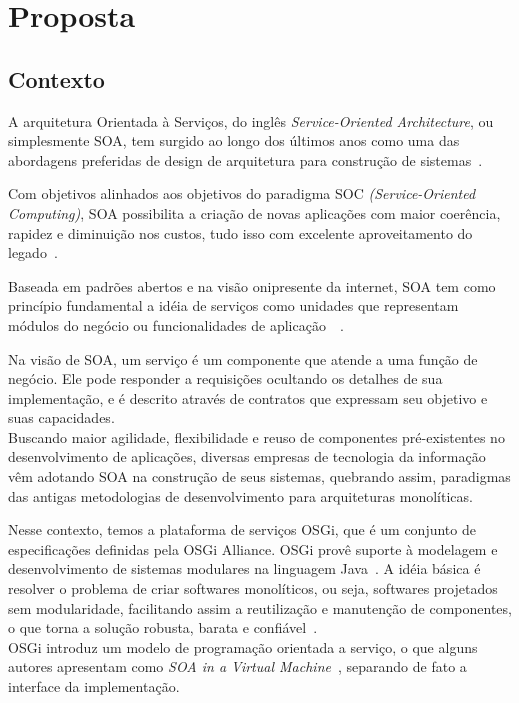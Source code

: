 \chapter{Proposta}
\section{Contexto}
\label{pr:contex}

A arquitetura Orientada à Serviços, do inglês \textit{Service-Oriented Architecture}, ou simplesmente SOA, tem surgido ao longo dos últimos anos como uma das abordagens preferidas de design de arquitetura para construção de sistemas~\cite{erl2008soa}.

Com objetivos alinhados aos objetivos do paradigma SOC \textit{(Service-Oriented Computing)}, SOA possibilita a criação de novas aplicações com maior coerência, rapidez e diminuição nos custos, tudo isso com excelente aproveitamento do legado~\cite{erl2008soa}.

Baseada em padrões abertos e na visão onipresente da internet, SOA tem como princípio fundamental a idéia de serviços como unidades que representam módulos do negócio ou funcionalidades de aplicação~\cite{erl2008soa}~\cite{imb2007soa}.

Na visão de SOA, um serviço é um componente que atende a uma função de negócio. Ele pode responder a requisições ocultando os detalhes de sua implementação, e é descrito através de contratos que expressam seu objetivo e suas capacidades.
\\

Buscando maior agilidade, flexibilidade e reuso de componentes pré-existentes no desenvolvimento de aplicações, diversas empresas de tecnologia da informação vêm adotando SOA na construção de seus sistemas, quebrando assim, paradigmas das antigas metodologias de desenvolvimento para arquiteturas monolíticas.

Nesse contexto, temos a plataforma de serviços OSGi, que é um conjunto de especificações definidas pela OSGi Alliance. OSGi provê suporte à modelagem e desenvolvimento de sistemas modulares na linguagem Java~\cite{hall2010osgi}. A idéia básica é resolver o problema de criar softwares monolíticos, ou seja, softwares projetados sem modularidade, facilitando assim a reutilização e manutenção de  componentes, o que torna a solução robusta, barata e confiável~\cite{davis2009open}. \\

OSGi introduz um modelo de programação orientada a serviço, o que alguns autores apresentam como \textit{SOA in a Virtual Machine}~\cite{hall2010osgi}, separando de fato a interface da implementação.

